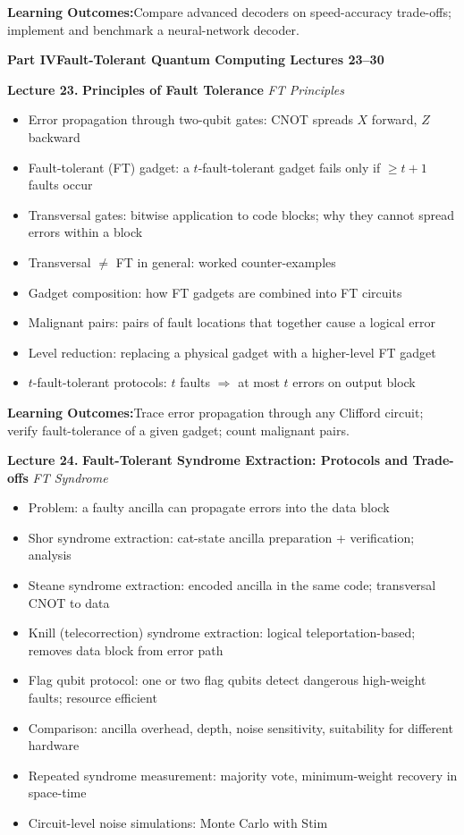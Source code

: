\documentclass[12pt,oneside]{article}
\newcommand{\parthead}[3]{%
  \vspace{16pt}
  \begin{tcolorbox}[
    enhanced,colback=partbg,colframe=partbg,
    arc=3pt,left=10pt,right=10pt,top=7pt,bottom=7pt,boxrule=0pt
  ]
    \color{white}\large\bfseries
    Part #1\enspace\textbar\enspace #2
    \hfill\normalfont\normalsize\color{white!80!partbg}Lectures #3
  \end{tcolorbox}
  \vspace{2pt}
}
\newcommand{\lecturetitle}[3]{%
  \vspace{10pt}
  \begin{tcolorbox}[
    enhanced,breakable,
    colback=highlight,colframe=accent,
    arc=2pt,left=10pt,right=8pt,top=7pt,bottom=7pt,boxrule=0.7pt
  ]
    \textbf{\color{accent}Lecture #1.\enspace}%
    {\color{primary}\bfseries #2}%
    \hfill{\small\color{warmgold}\textit{#3}}
  \end{tcolorbox}
  \vspace{-2pt}
}
\newcommand{\topics}[1]{%
  \begin{itemize}[leftmargin=1.5em,itemsep=1.5pt,topsep=3pt,parsep=0pt]
    #1
  \end{itemize}\vspace{2pt}
}
\newcommand{\T}[1]{\item #1}
\newcommand{\keybox}[1]{%
  \begin{tcolorbox}[
    enhanced,colback=lightgray,colframe=rulegray,
    arc=2pt,left=8pt,right=8pt,top=5pt,bottom=5pt,boxrule=0.4pt,
    fontupper=\small
  ]
    \textbf{\color{primary}Learning Outcomes:\enspace}#1
  \end{tcolorbox}\vspace{4pt}
}
\begin{document}
\keybox{Compare advanced decoders on speed-accuracy trade-offs; implement and benchmark a neural-network decoder.}

\newpage


\parthead{IV}{Fault-Tolerant Quantum Computing}{23--30}

\lecturetitle{23}{Principles of Fault Tolerance}{FT Principles}

\topics{
  \T{Error propagation through two-qubit gates: CNOT spreads $X$ forward, $Z$ backward}
  \T{Fault-tolerant (FT) gadget: a $t$-fault-tolerant gadget fails only if $\geq t+1$ faults occur}
  \T{Transversal gates: bitwise application to code blocks; why they cannot spread errors within a block}
  \T{Transversal $\neq$ FT in general: worked counter-examples}
  \T{Gadget composition: how FT gadgets are combined into FT circuits}
  \T{Malignant pairs: pairs of fault locations that together cause a logical error}
  \T{Level reduction: replacing a physical gadget with a higher-level FT gadget}
  \T{$t$-fault-tolerant protocols: $t$ faults $\Rightarrow$ at most $t$ errors on output block}
}

\keybox{Trace error propagation through any Clifford circuit; verify fault-tolerance of a given gadget; count malignant pairs.}

\lecturetitle{24}{Fault-Tolerant Syndrome Extraction: Protocols and Trade-offs}{FT Syndrome}

\topics{
  \T{Problem: a faulty ancilla can propagate errors into the data block}
  \T{Shor syndrome extraction: cat-state ancilla preparation + verification; analysis}
  \T{Steane syndrome extraction: encoded ancilla in the same code; transversal CNOT to data}
  \T{Knill (telecorrection) syndrome extraction: logical teleportation-based; removes data block from error path}
  \T{Flag qubit protocol: one or two flag qubits detect dangerous high-weight faults; resource efficient}
  \T{Comparison: ancilla overhead, depth, noise sensitivity, suitability for different hardware}
  \T{Repeated syndrome measurement: majority vote, minimum-weight recovery in space-time}
  \T{Circuit-level noise simulations: Monte Carlo with Stim}
}
\end{document}
